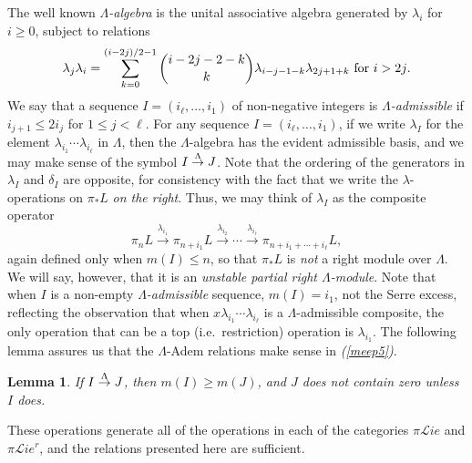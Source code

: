 \documentclass[11pt]{amsart} \renewcommand{\baselinestretch}{1.4}
\theoremstyle{plain}
\newtheorem{lem}[thm]{Lemma}
\theoremstyle{definition}
\renewcommand{\to}{\longrightarrow}
\newcommand{\scrL}{\mathscr{L}}
\newcommand{\PA}[1]{\pi#1}
\newcommand{\minDimDelta}{m}
\newcommand{\produces}[3]{#3:#1\sim #2}
\renewcommand{\produces}[3]{#1\rightarrow_{#3} #2}%
\renewcommand{\produces}[3]{#1\overset{\smash{#3}}{\rightarrow} #2}%
\newcommand{\liealgs}{{\scrL\!\textit{ie}}}
\newcommand{\restliealgs}{{\scrL\!\textit{ie}^\textit{r}}}
\begin{document}
\begin{Constructing homotopy operations}
The well known \emph{$\Lambda$-algebra} is the unital associative algebra generated by $\lambda_i$ for $i\geq0$, subject to relations \[\lambda_j\lambda_i=\sum_{k=0}^{(i-2j)/2-1}{i-2j-2-k\choose k}\lambda_{i-j-1-k}\lambda_{2j+1+k}\textup{\ for $i>2j$.}\]
We say that a sequence $I=(i_\ell,\ldots,i_1)$ of non-negative integers is \emph{$\Lambda$-admissible} if $i_{j+1}\leq 2i_j$ for $1\leq j <\ell$. 
For any sequence $I=(i_\ell,\ldots,i_1)$, if we write $\lambda_I$ for the element $\lambda_{i_1}\cdots \lambda_{i_\ell}$ in $\Lambda$, then the $\Lambda$-algebra has the evident admissible basis, and we may make sense of the symbol $\produces{I}{J}{\Lambda}$. Note that the ordering of the generators in $\lambda_I$ and $\delta_I$ are opposite, for consistency with the fact that we write the $\lambda$-operations on $\pi_*L$ \emph{on the right}. Thus, we may think of $\lambda_I$ as the composite operator  
\[\pi_{n}L\overset{\lambda_{i_1}}{\to}\pi_{n+i_1}L\overset{\lambda_{i_2}}{\to}\cdots \overset{\lambda_{i_\ell}}{\to}\pi_{n+i_1+\cdots +i_\ell}L,\]
again defined only when $\minDimDelta(I)\leq n$, so that $\pi_*L$ is \emph{not} a right module over $\Lambda$. We will say, however, that it is an \emph{unstable partial right $\Lambda$-module}.
Note that when $I$ is a non-empty \emph{$\Lambda$-admissible} sequence,
$\minDimDelta(I)=i_1$, not the Serre excess, reflecting the observation that when $x\lambda_{i_1}\cdots \lambda_{i_\ell}$ is a $\Lambda$-admissible composite, the only operation that  can be a top (i.e.\ restriction) operation is $\lambda_{i_1}$.
The following lemma assures us that the $\Lambda$-Adem relations make sense in \emph{(\ref{meep5})}.
\begin{lem}
\label{lemOnAdemChangeInMLambdaPlain}
If $\produces{I}{J}{\Lambda}$, then $\minDimDelta(I)\geq\minDimDelta(J)$, and $J$ does not contain zero unless $I$ does.
\end{lem}
These operations generate all of the operations in each of the categories $\PA{\liealgs}$ and $\PA{\restliealgs}$, and the relations presented here are sufficient. 



\end{Constructing homotopy operations}
\end{document}

